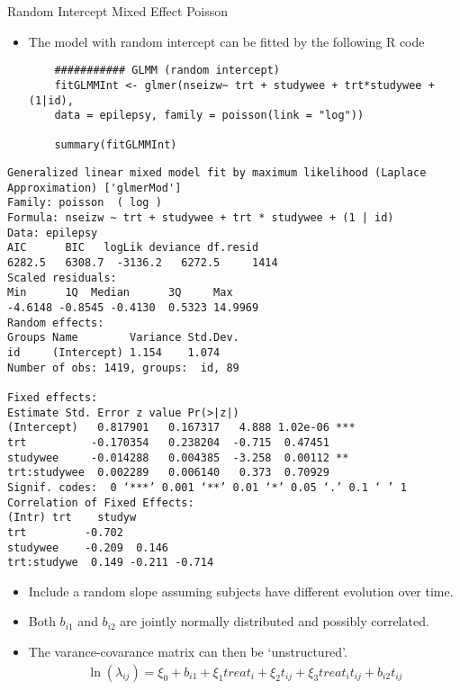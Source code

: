 \documentclass{beamer}
\begin{document}
\begin{frame}[fragile]{Random Intercept Mixed Effect Poisson}
\begin{itemize}
	\item The model with random intercept can be fitted by the following R code
	\scriptsize
	\begin{verbatim}
	########### GLMM (random intercept)
	fitGLMMInt <- glmer(nseizw~ trt + studywee + trt*studywee + (1|id), 
	data = epilepsy, family = poisson(link = "log"))
	
	summary(fitGLMMInt)
	\end{verbatim}
\end{itemize}
\end{frame}

\begin{frame}[fragile]
\scriptsize
\begin{verbatim}
Generalized linear mixed model fit by maximum likelihood (Laplace Approximation) ['glmerMod']
Family: poisson  ( log )
Formula: nseizw ~ trt + studywee + trt * studywee + (1 | id)
Data: epilepsy
AIC      BIC   logLik deviance df.resid 
6282.5   6308.7  -3136.2   6272.5     1414 
Scaled residuals: 
Min      1Q  Median      3Q     Max 
-4.6148 -0.8545 -0.4130  0.5323 14.9969 
Random effects:
Groups Name        Variance Std.Dev.
id     (Intercept) 1.154    1.074   
Number of obs: 1419, groups:  id, 89

Fixed effects:
Estimate Std. Error z value Pr(>|z|)    
(Intercept)   0.817901   0.167317   4.888 1.02e-06 ***
trt          -0.170354   0.238204  -0.715  0.47451    
studywee     -0.014288   0.004385  -3.258  0.00112 ** 
trt:studywee  0.002289   0.006140   0.373  0.70929    
Signif. codes:  0 ‘***’ 0.001 ‘**’ 0.01 ‘*’ 0.05 ‘.’ 0.1 ‘ ’ 1
Correlation of Fixed Effects:
(Intr) trt    studyw
trt         -0.702              
studywee    -0.209  0.146       
trt:studywe  0.149 -0.211 -0.714
\end{verbatim}
\end{frame}

\begin{frame}
\vspace{2mm}
\begin{itemize}
\item Include a random slope assuming subjects have different evolution over time.
\item Both $b_{i1}$ and $b_{i2}$ are jointly normally distributed and possibly correlated.
\item The varance-covarance matrix can then be `unstructured'.
\begin{eqnarray}
\ln(\lambda_{ij}) = \xi_0 + b_{i1} +\xi_1 treat_i + \xi_2 t_{ij}+ \xi_3 treat_i t_{ij} + b_{i2}t_{ij} \nonumber
\end{eqnarray}
\end{itemize}
\end{frame}
\end{document}
